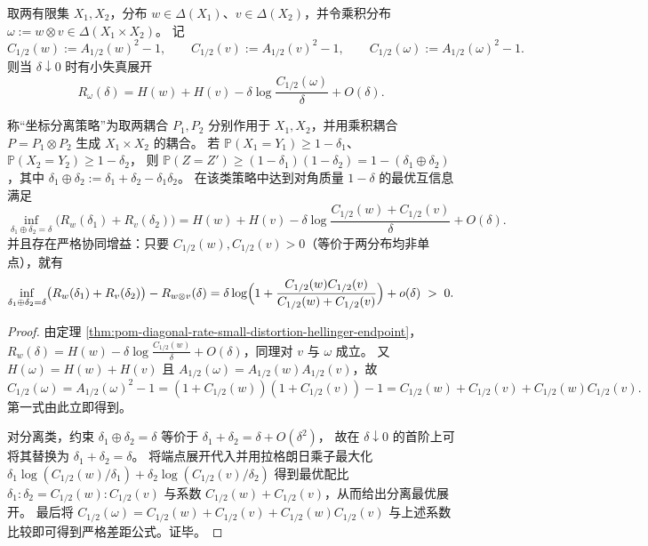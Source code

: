 \begin{theorem}\label{thm:pom-diagonal-rate-small-distortion-synergy-product}
取两有限集 \(X_1,X_2\)，分布 \(w\in\Delta(X_1)\)、\(v\in\Delta(X_2)\)，并令乘积分布 \(\omega:=w\otimes v\in\Delta(X_1\times X_2)\)。
记
\[
C_{1/2}(w):=A_{1/2}(w)^2-1,\qquad C_{1/2}(v):=A_{1/2}(v)^2-1,\qquad
C_{1/2}(\omega):=A_{1/2}(\omega)^2-1.
\]
则当 \(\delta\downarrow 0\) 时有小失真展开
\[
R_{\omega}(\delta)=H(w)+H(v)-\delta\log\frac{C_{1/2}(\omega)}{\delta}+O(\delta).
\]
\par
称“坐标分离策略”为取两耦合 \(P_1,P_2\) 分别作用于 \(X_1,X_2\)，并用乘积耦合 \(P=P_1\otimes P_2\) 生成 \(X_1\times X_2\) 的耦合。
若
\(
\mathbb P(X_1=Y_1)\ge 1-\delta_1
\)、
\(
\mathbb P(X_2=Y_2)\ge 1-\delta_2
\)，
则
\(
\mathbb P(Z=Z')\ge (1-\delta_1)(1-\delta_2)=1-(\delta_1\oplus\delta_2)
\)，其中 \(\delta_1\oplus\delta_2:=\delta_1+\delta_2-\delta_1\delta_2\)。
在该类策略中达到对角质量 \(1-\delta\) 的最优互信息满足
\[
\inf_{\delta_1\oplus\delta_2=\delta}\bigl(R_w(\delta_1)+R_v(\delta_2)\bigr)
=H(w)+H(v)-\delta\log\frac{C_{1/2}(w)+C_{1/2}(v)}{\delta}+O(\delta).
\]
并且存在严格协同增益：只要 \(C_{1/2}(w),C_{1/2}(v)>0\)（等价于两分布均非单点），就有
\[
\inf_{\delta_1\oplus\delta_2=\delta}\bigl(R_w(\delta_1)+R_v(\delta_2)\bigr)-R_{w\otimes v}(\delta)
=\delta\log\Bigl(1+\frac{C_{1/2}(w)C_{1/2}(v)}{C_{1/2}(w)+C_{1/2}(v)}\Bigr)+o(\delta)\;>\;0.
\]
\end{theorem}
\begin{proof}
由定理 \ref{thm:pom-diagonal-rate-small-distortion-hellinger-endpoint}，
\(
R_w(\delta)=H(w)-\delta\log\frac{C_{1/2}(w)}{\delta}+O(\delta)
\)，同理对 \(v\) 与 \(\omega\) 成立。
又 \(H(\omega)=H(w)+H(v)\) 且
\(
A_{1/2}(\omega)=A_{1/2}(w)A_{1/2}(v)
\)，故
\[
C_{1/2}(\omega)
=A_{1/2}(\omega)^2-1
=(1+C_{1/2}(w))(1+C_{1/2}(v))-1
=C_{1/2}(w)+C_{1/2}(v)+C_{1/2}(w)C_{1/2}(v).
\]
第一式由此立即得到。
\par
对分离类，约束 \(\delta_1\oplus\delta_2=\delta\) 等价于 \(\delta_1+\delta_2=\delta+O(\delta^2)\)，
故在 \(\delta\downarrow 0\) 的首阶上可将其替换为 \(\delta_1+\delta_2=\delta\)。
将端点展开代入并用拉格朗日乘子最大化
\(
\delta_1\log(C_{1/2}(w)/\delta_1)+\delta_2\log(C_{1/2}(v)/\delta_2)
\)
得到最优配比 \(\delta_1:\delta_2=C_{1/2}(w):C_{1/2}(v)\) 与系数 \(C_{1/2}(w)+C_{1/2}(v)\)，从而给出分离最优展开。
最后将 \(C_{1/2}(\omega)=C_{1/2}(w)+C_{1/2}(v)+C_{1/2}(w)C_{1/2}(v)\) 与上述系数比较即可得到严格差距公式。证毕。
\end{proof}

